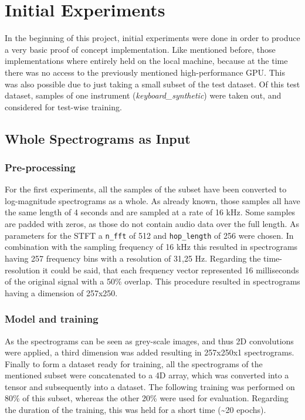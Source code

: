  \newpage
\section{Initial Experiments}
\label{sec:exp_init_experiment}
In the beginning of this project, initial experiments were done in order to produce a very basic proof of concept implementation. Like mentioned before, those implementations where entirely held on the local machine, because at the time there was no access to the previously mentioned high-performance GPU. This was also possible due to just taking a small subset of the test dataset. Of this test dataset, samples of one instrument (\textit{keyboard\_synthetic}) were taken out, and considered for test-wise training.

\subsection{Whole Spectrograms as Input}

\subsubsection{Pre-processing}
For the first experiments, all the samples of the subset have been converted to log-magnitude spectrograms as a whole. As already known, those samples all have the same length of 4 seconds and are sampled at a rate of 16 kHz. Some samples are padded with zeros, as those do not contain audio data over the full length. As parameters for the STFT a \texttt{n\_fft} of 512 and \texttt{hop\_length} of 256 were chosen. In combination with the sampling frequency of 16 kHz this resulted in spectrograms having 257 frequency bins with a resolution of 31,25 Hz. Regarding the time-resolution it could be said, that each frequency vector represented 16 milliseconds of the original signal with a 50\% overlap. This procedure resulted in spectrograms having a dimension of 257x250. 

\subsubsection{Model and training}
As the spectrograms can be seen as grey-scale images, and thus 2D convolutions were applied, a third dimension was added resulting in 257x250x1 spectrograms. Finally to form a dataset ready for training, all the spectrograms of the mentioned subset were concatenated to a 4D array, which was converted into a tensor and subsequently into a dataset. The following training was performed on 80\% of this subset, whereas the other 20\% were used for evaluation. Regarding the duration of the training, this was held for a short time (\textasciitilde20 epochs).


